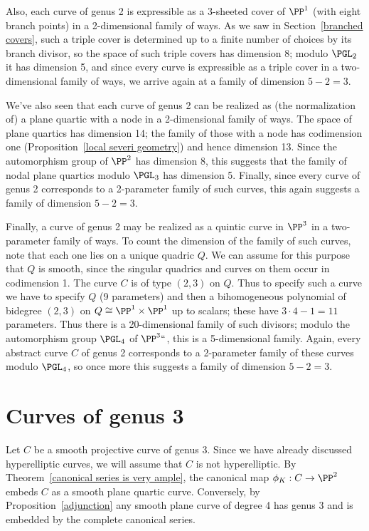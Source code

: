 Also, each curve  of genus 2 is expressible as a 3-sheeted cover of
$\PP^1$ (with eight branch points) in a 2-dimensional family of ways. As
we saw in Section~\ref{branched covers}, such a triple cover is determined
up to a finite number of choices by its branch divisor, so the space of
such triple covers has dimension 8; modulo $\PGL_2$ it has dimension 5, and
%
since every curve is expressible as a triple cover in a two-dimensional
family of ways, we arrive again at a family of dimension $ 5-2 = 3$.

We've also seen that each curve of genus 2 can be realized as (the
normalization of) a plane quartic  with a node in a 2-dimensional family
%
of ways. The space of plane quartics has dimension 14; the family
of those with a node has codimension one
\label{nodal plane quartics}
(Proposition~\ref{local severi geometry})
and hence dimension 13. Since  the automorphism group 
%
of $\PP^2$ has dimension 8, this suggests that the family of nodal
plane quartics modulo $\PGL_3$ has dimension 5. Finally, since every
curve of genus 2 corresponds to a 2-parameter family of such curves,
this again suggests a family of dimension $ 5-2=3$.

Finally, a curve of genus 2 may be realized as a quintic curve in $\PP^3$
in a two-parameter family of ways. To count the dimension of the family
of such curves, note that each one lies on a unique quadric $Q$. We can
assume for this purpose that $Q$ is smooth, since the singular quadrics
and curves on them occur in codimension 1. The curve $C$ is of type
$(2,3)$ on $Q$. Thus to specify such a curve we have to specify $Q$
(9 parameters) and then a bihomogeneous polynomial of bidegree $(2,3)$
on $Q \cong \PP^1 \times \PP^1$ up to scalars; these have $3\cdot 4 - 1 =
11$ parameters. Thus there is a 20-dimensional family of such divisors;
modulo the automorphism group $\PGL_4$ of $\PP^3` `$, this is a 5-dimensional
family. Again, every abstract curve $C$ of genus 2 corresponds to a
2-parameter family of these curves modulo $\PGL_4$, so once more this
suggests a family of dimension $ 5 - 2 = 3$.

\section{Curves of genus 3}

Let $C$ be a smooth projective curve of genus 3. Since we have already
discussed hyperelliptic curves,
we will assume  that $C$ is not hyperelliptic. By
Theorem~\ref{canonical series is very ample}, the canonical map
$\phi_K : C \to \PP^2$ embeds $C$ as a smooth plane quartic curve.
%
Conversely, by Proposition~\ref{adjunction} any smooth plane curve of
degree 4 has genus 3 and is embedded by the complete canonical series.

